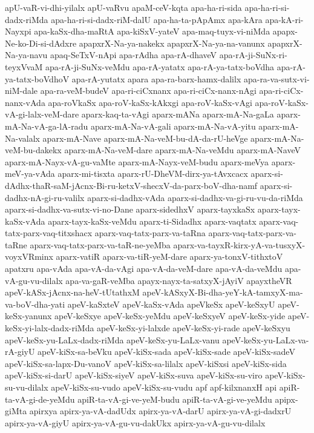 {apU-vaR-vi-dhi-yilalx
apU-vaRvu
apaM-ceV-kqta
apa-ha-ri-sida
apa-ha-ri-si-dadx-riMda
apa-ha-ri-si-dadx-riM-dalU
apa-ha-ta-pApAmx
apa-kAra
apa-kA-ri-Nayxpi
apa-kaSx-dha-maRtA
apa-kiSxV-yateV
apa-maq-tuyx-vi-niMda
apapx-Ne-ko-Di-si-dAdxre
apapxrX-Na-ya-nakekx
apapxrX-Na-ya-na-vanunx
apapxrX-Na-ya-navu
apaq-SeTxV-nApi
apa-rAdha
apa-rA-dhaveV
apa-rA-ji-SuNx-ri-teyxVvaM
apa-rA-ji-SuNx-veMdu
apa-rA-yatatx
apa-rA-ya-tatx-boVdha
apa-rA-ya-tatx-boVdhoV
apa-rA-yutatx
apara
apa-ra-barx-hamx-dalilx
apa-ra-va-sutx-vi-niM-dale
apa-ra-veM-budeV
apa-ri-ciCxnanx
apa-ri-ciCx-nanx-nAgi
apa-ri-ciCx-nanx-vAda
apa-roVkaSx
apa-roV-kaSx-kAkxgi
apa-roV-kaSx-vAgi
apa-roV-kaSx-vA-gi-lalx-veM-dare
aparx-kaq-ta-vAgi
aparx-mANa
aparx-mA-Na-gaLa
aparx-mA-Na-vA-ga-lA-radu
aparx-mA-Na-vA-gali
aparx-mA-Na-vA-yitu
aparx-mA-Na-valalx
aparx-mA-Nave
aparx-mA-Na-veM-bu-dA-da-rU-heVge
aparx-mA-Na-veM-bu-dakekx
aparx-mA-Na-veM-dare
aparx-mA-Na-veMdu
aparx-mA-NaveV
aparx-mA-Nayx-vA-gu-vaMte
aparx-mA-Nayx-veM-budu
aparx-meVya
aparx-meV-ya-vAda
aparx-mi-tisxta
aparx-rU-DheVM-dirx-ya-tAvxcacx
aparx-si-dAdhx-thaR-saM-jAcnx-Bi-ru-ketxV-shecxV-da-parx-boV-dha-namf
aparx-si-dadhx-nA-gi-ru-valilx
aparx-si-dadhx-vAda
aparx-si-dadhx-va-gi-ru-vu-da-riMda
aparx-si-dadhx-va-sutx-vi-no-Dane
aparx-sidedhxV
aparx-tayxkaSx
aparx-tayx-kaSx-vAda
aparx-tayx-kaSx-veMdu
aparx-ti-Sidadhx
aparx-vaqtatx
aparx-vaq-tatx-parx-vaq-titxshacx
aparx-vaq-tatx-parx-va-taRna
aparx-vaq-tatx-parx-va-taRne
aparx-vaq-tatx-parx-va-taR-ne-yeMba
aparx-va-tayxR-kirx-yA-va-tusxyX-voyxVRminx
aparx-vatiR
aparx-va-tiR-yeM-dare
aparx-ya-tonxV-tithxtoV
apatxru
apa-vAda
apa-vA-da-vAgi
apa-vA-da-veM-dare
apa-vA-da-veMdu
apa-vA-gu-vu-dilalx
apa-va-gaR-veMba
apayx-nayx-ta-satxyX-jAyiV
apayxtheVR
apeV-kASx-jAcnx-na-heV-tUtathxM
apeV-kASxyX-Bi-dha-yeY-kA-tamxyX-ma-va-boV-dha-yati
apeV-kaSxteV
apeV-kaSx-vAda
apeVkeSx
apeV-keSxyU
apeV-keSx-yanunx
apeV-keSxye
apeV-keSx-yeMdu
apeV-keSxyeV
apeV-keSx-yide
apeV-keSx-yi-lalx-dadx-riMda
apeV-keSx-yi-lalxde
apeV-keSx-yi-rade
apeV-keSxyu
apeV-keSx-yu-LaLx-dadx-riMda
apeV-keSx-yu-LaLx-vanu
apeV-keSx-yu-LaLx-va-rA-giyU
apeV-kiSx-sa-beVku
apeV-kiSx-sada
apeV-kiSx-sade
apeV-kiSx-sadeV
apeV-kiSx-sa-lapx-Du-vanoV
apeV-kiSx-sa-lilalx
apeV-kiSxsi
apeV-kiSx-sida
apeV-kiSx-si-darU
apeV-kiSx-siyeV
apeV-kiSx-suva
apeV-kiSx-su-viro
apeV-kiSx-su-vu-dilalx
apeV-kiSx-su-vudo
apeV-kiSx-su-vudu
apf
apf-kilxnanxH
api
apiR-ta-vA-gi-de-yeMdu
apiR-ta-vA-gi-ve-yeM-budu
apiR-ta-vA-gi-ve-yeMdu
apipx-giMta
apirxya
apirx-ya-vA-dadUdx
apirx-ya-vA-darU
apirx-ya-vA-gi-dadxrU
apirx-ya-vA-giyU
apirx-ya-vA-gu-vu-dakUkx
apirx-ya-vA-gu-vu-dilalx
}

